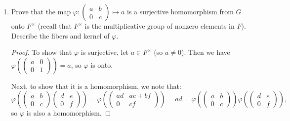 \documentclass{article}
\begin{document}
\begin{enumerate}[label=(\alph*), itemsep=0em]
    \item Prove that the map $\varphi: \begin{pmatrix}a & b \\ 0 & c\end{pmatrix} \mapsto a$ is a surjective homomorphism from $G$ onto $F^\times$ (recall that $F^\times$ is the multiplicative group of nonzero elements in $F$). Describe the fibers and kernel of $\varphi$.
          \begin{proof}
            To show that $\varphi$ is surjective, let $a \in F^\times$ (so $a \neq 0$). Then we have $\varphi(\begin{pmatrix}a & 0 \\ 0 & 1\end{pmatrix}) = a$, so $\varphi$ is onto.

            Next, to show that it is a homomorphism, we note that:
            \begin{equation*}
                \varphi(\begin{pmatrix}a & b \\ 0 & c\end{pmatrix}\begin{pmatrix}d & e \\ 0 & f\end{pmatrix}) = \varphi(\begin{pmatrix}ad & ae + bf \\ 0 & cf\end{pmatrix}) = ad = \varphi(\begin{pmatrix}a & b \\ 0 & c\end{pmatrix})\varphi(\begin{pmatrix}d & e \\ 0 & f\end{pmatrix}),
            \end{equation*}
            so $\varphi$ is also a homomorphism.


\end{proof}
\end{enumerate}
\end{document}
